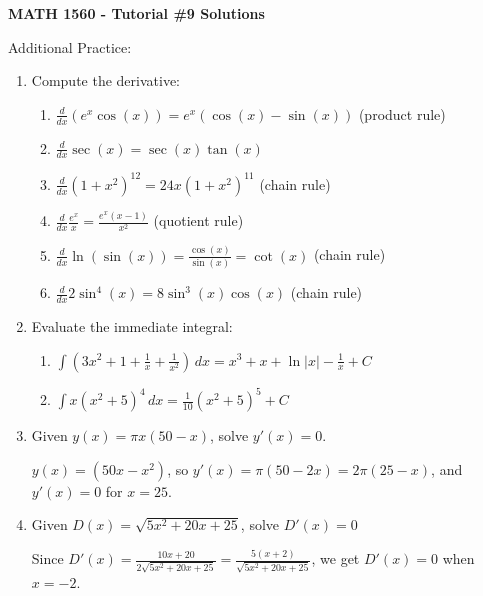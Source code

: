 \documentclass[12pt]{article}
\newcommand{\di}{\displaystyle}
\newcommand{\abs}[1]{\lvert #1\rvert}
\begin{document}
\author{Instructor: Sean Fitzpatrick}
\thispagestyle{empty}
\begin{center}
{\bf MATH 1560 - Tutorial \#9 Solutions}\
\end{center}

Additional Practice:
\begin{enumerate}
\item Compute the derivative:
\begin{enumerate}
\item $\di\frac{d}{dx}(e^x\cos(x)) = e^x(\cos(x)-\sin(x))$ (product rule)
\item $\di \frac{d}{dx}\sec(x) = \sec(x)\tan(x)$
\item $\di\frac{d}{dx}(1+x^2)^{12} = 24x(1+x^2)^{11}$ (chain rule)
\item $\di\frac{d}{dx}\frac{e^x}{x} = \frac{e^x(x-1)}{x^2}$ (quotient rule)
\item $\di\frac{d}{dx}\ln(\sin(x)) = \frac{\cos(x)}{\sin(x)}=\cot(x)$ (chain rule)
\item $\di\frac{d}{dx}2\sin^4(x)=8\sin^3(x)\cos(x)$ (chain rule)
\end{enumerate}

\item Evaluate the immediate integral:

\begin{enumerate}
\item $\di \int(3x^2+1+\frac1x+\frac{1}{x^2})\,dx = x^3+x+\ln\abs{x}-\frac1x +C$
\item $\di \int x(x^2+5)^4\,dx = \frac{1}{10}(x^2+5)^5+C$
\end{enumerate}

\item Given $y(x)=\pi x(50-x)$, solve $y'(x)=0$.

$y(x) = (50 x- x^2)$, so  $y'(x) = \pi(50-2x)=2\pi(25-x)$, and $y'(x)=0$ for $x=25$.

\item Given $D(x) = \sqrt{5x^2+20x+25}$, solve $D'(x)=0$

Since $\di D'(x) =\frac{10x+20}{2\sqrt{5x^2+20x+25}}=\frac{5(x+2)}{\sqrt{5x^2+20x+25}}$, we get $D'(x)=0$ when $x=-2$.
\end{enumerate}




\newpage
\end{document}
